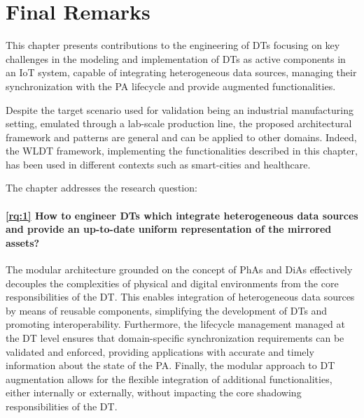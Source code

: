 \section{Final Remarks}

This chapter presents contributions to the engineering of \acp{DT} focusing on key challenges in the modeling and implementation of \acp{DT} as active components in an \ac{IoT} system, capable of integrating heterogeneous data sources, managing their synchronization with the \ac{PA} lifecycle and provide augmented functionalities. 

Despite the target scenario used for validation being an industrial manufacturing setting, emulated through a lab-scale production line, the proposed architectural framework and patterns are general and can be applied to other domains.
%
Indeed, the \ac{WLDT} framework, implementing the functionalities described in this chapter, has been used in different contexts such as smart-cities and healthcare. 

The chapter addresses the research question:

\paragraph{\ref{rq:1} How to engineer \acp{DT} which integrate heterogeneous data sources and provide an up-to-date uniform representation of the mirrored assets?}
%
The modular architecture grounded on the concept of \acp{PhA} and \acp{DiA} effectively decouples the complexities of physical and digital environments from the core responsibilities of the \ac{DT}.
%
This enables integration of heterogeneous data sources by means of reusable components, simplifying the development of \acp{DT} and promoting interoperability.
%
Furthermore, the lifecycle management managed at the \ac{DT} level ensures that domain-specific synchronization requirements can be validated and enforced, providing applications with accurate and timely information about the state of the \ac{PA}.
%
Finally, the modular approach to \ac{DT} augmentation allows for the flexible integration of additional functionalities, either internally or externally, without impacting the core shadowing responsibilities of the \ac{DT}.
